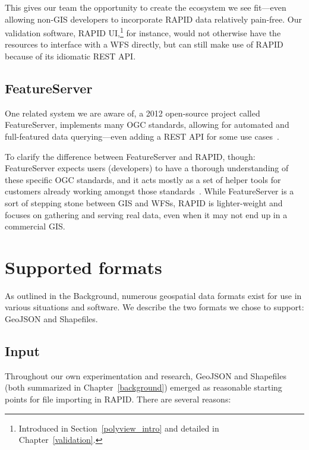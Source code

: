 This gives our team the opportunity to create the ecosystem we see fit---even allowing non-GIS developers to incorporate RAPID data relatively pain-free. Our validation software, RAPID UI,\footnote{Introduced in Section~\ref{polyview_intro} and detailed in Chapter~\ref{validation}.} for instance, would not otherwise have the resources to interface with a WFS directly, but can still make use of RAPID because of its idiomatic REST API.

\subsection{FeatureServer}

One related system we are aware of, a 2012 open-source project called FeatureServer, implements many OGC standards, allowing for automated and full-featured data querying---even adding a REST API for some use cases~\cite{FeatureServ}.

To clarify the difference between FeatureServer and RAPID, though: FeatureServer expects users (developers) to have a thorough understanding of these specific OGC standards, and it acts mostly as a set of helper tools for customers already working amongst those standards~\cite{FeatureServ}. While FeatureServer is a sort of stepping stone between GIS and WFSs, RAPID is lighter-weight and focuses on gathering and serving real data, even when it may not end up in a commercial GIS.

\section{Supported formats}
As outlined in the Background, numerous geospatial data formats exist for use in various situations and software. We describe the two formats we chose to support: GeoJSON and Shapefiles.

\subsection{Input}

Throughout our own experimentation and research, GeoJSON and Shapefiles (both summarized in Chapter~\ref{background}) emerged as reasonable starting points for file importing in RAPID. There are several reasons:

